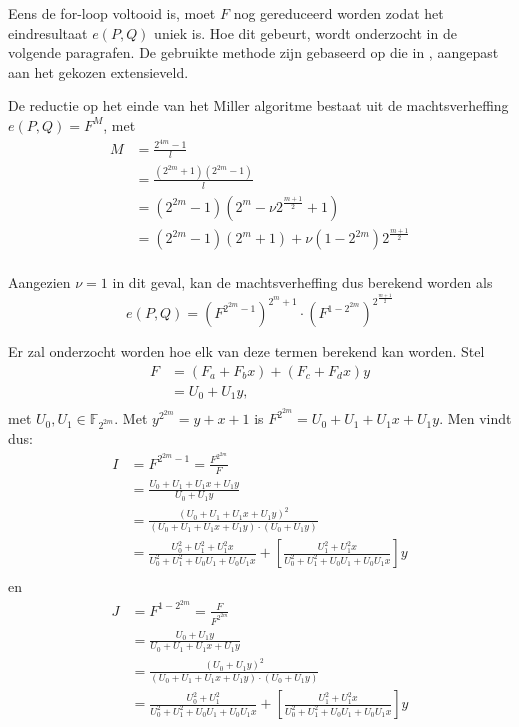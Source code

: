 Eens de for-loop voltooid is, moet $F$ nog gereduceerd worden zodat het eindresultaat $e(P, Q)$ uniek is. Hoe dit gebeurt, wordt onderzocht in de volgende paragrafen. De gebruikte methode zijn gebaseerd op die in \cite{beuchat}, aangepast aan het gekozen extensieveld.

De reductie op het einde van het Miller algoritme bestaat uit de machtsverheffing $e(P, Q) = F^M$, met
\[\begin{aligned}
M	&= \frac{2^{4m} - 1}{l}\\
	&= \frac{(2^{2m} + 1)(2^{2m} - 1)}{l}\\
	&= (2^{2m} - 1)(2^m - \nu 2^{\frac{m + 1}{2}} + 1)\\
	&= (2^{2m} - 1)(2^m + 1) + \nu(1 - 2^{2m})2^{\frac{m + 1}{2}}\\
\end{aligned}\]

Aangezien $\nu = 1$ in dit geval, kan de machtsverheffing dus berekend worden als
\[e(P, Q) = \left(F^{2^{2m} - 1}\right)^{2^m + 1} \cdot \left(F^{1 - 2^{2m}}\right)^{2^{\frac{m + 1}{2}}}\]

Er zal onderzocht worden hoe elk van deze termen berekend kan worden. Stel
\[\begin{aligned}
F	&= (F_a + F_b x) + (F_c + F_d x)y\\
	&= U_0 + U_1y,\\
\end{aligned}\]
met $U_0, U_1 \in \mathbb{F}_{2^{2m}}$. Met $y^{2^{2m}} = y + x + 1$ is $F^{2^{2m}} = U_0 + U_1 + U_1x + U_1y$. 	Men vindt dus:
\[\begin{aligned}
I  &= F^{2^{2m} - 1} = \frac{F^{2^{2m}}}{F}\\
	&= \frac{U_0 + U_1 + U_1x + U_1y}{U_0 + U_1y}\\
	&= \frac{(U_0 + U_1 + U_1x + U_1y)^2}{(U_0 + U_1 + U_1x + U_1y) \cdot (U_0 + U_1y)}\\
	&= \frac{U_0^2 + U_1^2 + U_1^2x}{U_0^2 + U_1^2 + U_0 U_1 + U_0 U_1 x} + \left[\frac{U_1^2 + U_1^2x}{U_0^2 + U_1^2 + U_0 U_1 + U_0 U_1 x}\right]y\\
\end{aligned}\]
en
\[\begin{aligned}
J  &= F^{1 - 2^{2m}} = \frac{F}{F^{2^{2m}}}\\
	&= \frac{U_0 + U_1y}{U_0 + U_1 + U_1x + U_1y}\\
	&= \frac{(U_0 + U_1y)^2}{(U_0 + U_1 + U_1x + U_1y) \cdot (U_0 + U_1y)}\\
	&= \frac{U_0^2 + U_1^2}{U_0^2 + U_1^2 + U_0 U_1 + U_0 U_1 x} + \left[\frac{U_1^2 + U_1^2x}{U_0^2 + U_1^2 + U_0 U_1 + U_0 U_1 x}\right]y\\
\end{aligned}\]

